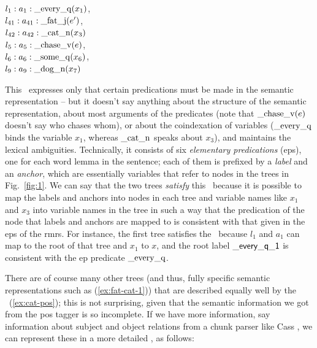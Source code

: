 \begin{examples}
\item \label{ex:cat-pos}
$l_1:a_1:\mathrm{\_every\_q}(x_1)$, \\
$l_{41}:a_{41}:\mathrm{\_fat\_j}(e')$,\\
$l_{42}:a_{42}:\mathrm{\_cat\_n}(x_3)$\\
$l_5:a_5:\mathrm{\_chase\_v}(e)$, \\
$l_6:a_6:\mathrm{\_some\_q}(x_6)$, \\
$l_9:a_9:\mathrm{\_dog\_n}(x_7)$
\end{examples}

This \rmrs\ expresses only that certain predications must be made in
the semantic representation -- but it doesn't say anything about the
structure of the semantic representation, about most arguments of the
predicates (note that $\mathrm{\_chase\_v}(e)$ doesn't say who chases
whom), or about the coindexation of variables ($\mathrm{\_every\_q}$
binds the variable $x_1$, whereas $\mathrm{\_cat\_n}$ speaks about
$x_3$), and maintains the lexical ambiguities.  Technically, it
consists of six \emph{elementary predications} ({\sc ep}s), one for
each word lemma in the sentence; each of them is prefixed by a
\emph{label} and an \emph{anchor}, which are essentially variables
that refer to nodes in the trees in Fig.~\ref{fig:1}.  We can say that
the two trees \emph{satisfy} this \rmrs\ because it is possible to map
the labels and anchors into nodes in each tree and variable names like
$x_1$ and $x_3$ into variable names in the tree in such a way that the
predication of the node that labels and anchors are mapped to is
consistent with that given in the {\sc ep}s of the {\sc rmrs}.  For
instance, the first tree satisfies the \rmrs\ because $l_1$ and $a_1$
can map to the root of that tree and $x_1$ to $x$, and the root label
$\mathsf{\_every\_q\_1}$ is consistent with the {\sc ep} predicate
$\mathrm{\_every\_q}$.


There are of course many other trees (and thus, fully specific
semantic representations such as (\ref{ex:fat-cat-1})) that are
described equally well by the \rmrs\ (\ref{ex:cat-pos}); this is not
surprising, given that the semantic information we got from the {\sc
  pos} tagger is so incomplete.  If we have more information, say
information about subject and object relations from a chunk parser
like Cass \cite{abney:1996}, we can represent these in a more detailed
\rmrs, as follows:

